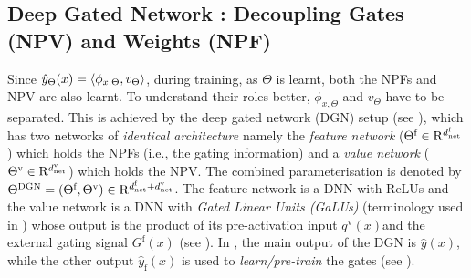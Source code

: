 \subsection{Deep Gated Network : Decoupling Gates (NPV) and Weights (NPF) }\label{sec:dgn}

Since $\hat{y}_{\Theta}(x)=\langle \phi_{x,\Theta},v_{\Theta}\rangle$, during training, as $\Theta$ is learnt, both the NPFs and NPV are also learnt. To understand their roles better, $\phi_{x,\Theta}$ and $v_{\Theta}$ have to be separated.  This is achieved by the deep gated network (DGN) setup (see ), which has two networks of \emph{identical architecture} namely the \emph{feature network} ($\Theta^{\textrm{f}}\in\mathrm{R}^{d^{\text{f}}_{\text{net}}}$) which holds the NPFs (i.e., the gating information) and a \emph{value network} (${\Theta}^{\text{v}}\in\mathrm{R}^{d^{\text{v}}_{\text{net}}}$) which holds the NPV.  The combined parameterisation is denoted by $\Theta^{\text{DGN}}=(\Theta^{\textrm{f}},{\Theta}^{\text{v}})\in \mathrm{R}^{d^{\text{f}}_{\text{net}}+d^{\text{v}}_{\text{net}}}$.  The feature network is a DNN with ReLUs and the value network is a DNN with \emph{Gated Linear Units (GaLUs)} (terminology used in ) whose output is the product of its pre-activation input $q^{\text{v}}(x)$and the external gating signal $G^{\text{f}}(x)$ (see ). In , the main output of the DGN is $\hat{y}(x)$, while the other output $\hat{y}_{\text{f}}(x)$ is used to \emph{learn/pre-train} the gates (see ).

